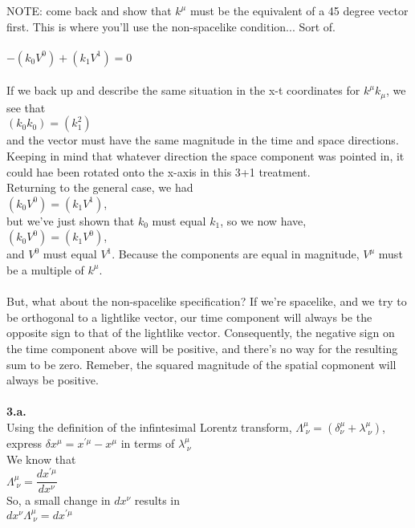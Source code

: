 \documentclass[prb,preprint]
{revtex4-1}
\newcommand{\PRLsep}{\noindent\makebox[\linewidth]{\resizebox{0.8888\linewidth}{2pt}{$\bullet$}}\bigskip}
\begin{document}
NOTE:  come back and show that $k^\mu$ must be the equivalent of a 45 degree vector first.  This is where you'll use the non-spacelike condition... Sort of.
\\
\\
$-\left(k_0 V^0\right) + \left(k_1 V^1\right) = 0$
\\
\\
If we back up and describe the same situation in the x-t coordinates for $k^\mu k_\mu$, we see that 
\\
$\left(k_0 k_0\right) = \left(k_1^2\right)$
\\
and the vector must have the same magnitude in the time and space directions.  Keeping in mind that whatever direction the space component was pointed in, it could hae been rotated onto the x-axis in this 3+1 treatment.
\\
Returning to the general case, we had 
\\
$\left(k_0 V^0\right) = \left(k_1 V^1\right)$, 
\\
but we've just shown that $k_0$ must equal $k_1$, so we now have, 
\\
$\left(k_0 V^0\right) = \left(k_1 V^0\right)$, 
\\
and $V^0$ must equal $V^1$.  Because the components are equal in magnitude, $V^\mu$ must be a multiple of $k^\mu$.
\\
\\
But, what about the non-spacelike specification?  If we're spacelike, and we try to be orthogonal to a lightlike vector, our time component will always be the opposite sign to that of the lightlike vector.  Consequently, the negative sign on the time component above will be positive, and there's no way for the resulting sum to be zero.  Remeber, the squared magnitude of the spatial copmonent will always be positive.
\\
\PRLsep
\\
\textbf{3.a.}
\\
Using the definition of the infintesimal Lorentz transform, $\Lambda^\mu_{\;\nu} = \left(\delta^\mu_\nu + \lambda^\mu_{\;\nu}\right)$, 
express $\delta x^\mu = x^{\prime\mu} - x^\mu$ in terms of $\lambda^\mu_{\;\nu}$
\\
We know that 
\\
$\Lambda^\mu_{\;\nu} = \dfrac{dx^{\prime\mu}}{dx^\nu}$
\\
So, a small change in $dx^\nu$ results in 
\\
$dx^\nu \Lambda^\mu_{\;\nu} = dx^{\prime \mu}$
\\
\end{document}
